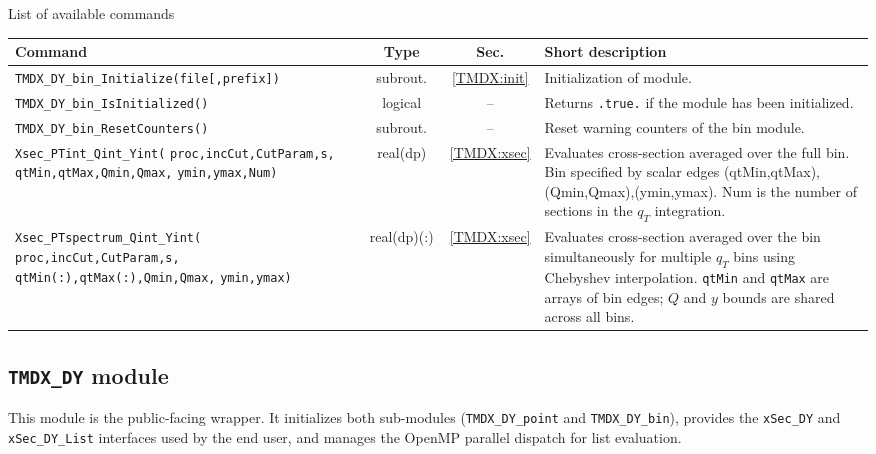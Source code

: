 \documentclass[prd,nofootinbib,eqsecnum,final]{revtex4}
\renewcommand{\(}{\left(}
\renewcommand{\)}{\right)}
\renewcommand{\[}{\left[}
\renewcommand{\]}{\right]}
\begin{document}
\begin{center}
List of available commands
\\
\begin{tabular}{||p{6cm}|c|c|p{8cm}||}
\hline\hline
Command & ~~Type~~& ~~Sec.~~ & Short description
\\\hline
\texttt{TMDX{\_}DY{\_}bin{\_}Initialize(file[,prefix])} & subrout. & \ref{TMDX:init} & Initialization of module.
\\\hline
\texttt{TMDX{\_}DY{\_}bin{\_}IsInitialized()} & logical & -- & Returns \texttt{.true.} if the module has been initialized.
\\\hline
\texttt{TMDX{\_}DY{\_}bin{\_}ResetCounters()} & subrout. & -- & Reset warning counters of the bin module.
\\\hline
\texttt{Xsec{\_}PTint{\_}Qint{\_}Yint(} \texttt{proc,incCut,CutParam,s,} \texttt{qtMin,qtMax,Qmin,Qmax,} \texttt{ymin,ymax,Num)} & real(dp) &\ref{TMDX:xsec} & Evaluates cross-section averaged over the full bin. Bin specified by scalar edges (qtMin,qtMax),(Qmin,Qmax),(ymin,ymax). Num is the number of sections in the $q_T$ integration.
\\\hline
\texttt{Xsec{\_}PTspectrum{\_}Qint{\_}Yint(} \texttt{proc,incCut,CutParam,s,} \texttt{qtMin(:),qtMax(:),Qmin,Qmax,} \texttt{ymin,ymax)} & real(dp)(:) &\ref{TMDX:xsec} & Evaluates cross-section averaged over the bin simultaneously for multiple $q_T$ bins using Chebyshev interpolation. \texttt{qtMin} and \texttt{qtMax} are arrays of bin edges; $Q$ and $y$ bounds are shared across all bins.
\\\hline\hline
\end{tabular}
\end{center}

\subsection{\texttt{TMDX{\_}DY} module}

This module is the public-facing wrapper. It initializes both sub-modules (\texttt{TMDX\_DY\_point} and \texttt{TMDX\_DY\_bin}), provides the \texttt{xSec\_DY} and \texttt{xSec\_DY\_List} interfaces used by the end user, and manages the OpenMP parallel dispatch for list evaluation.
\end{document}
